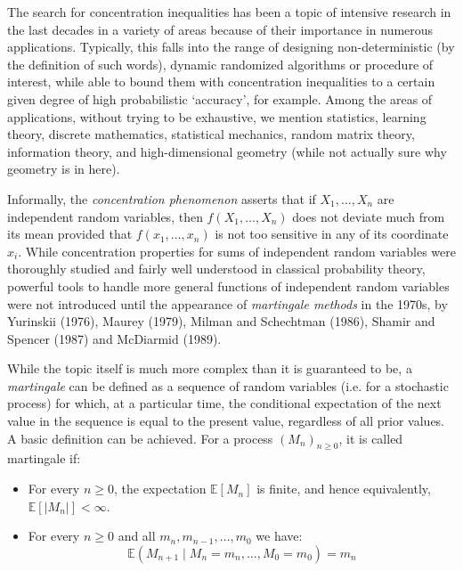 The search for concentration inequalities has been a topic of intensive research in the last decades in a variety of areas because of their importance in numerous applications. Typically, this falls into the range of designing non-deterministic (by the definition of such words), dynamic randomized algorithms or procedure of interest, while able to bound them with concentration inequalities to a certain given degree of high probabilistic `accuracy', for example. Among the areas of applications, without trying to be exhaustive, we mention statistics, learning theory, discrete mathematics, statistical mechanics, random matrix theory, information theory, and high-dimensional geometry (while not actually sure why geometry is in here). 

Informally, the \textit{concentration phenomenon} asserts that if $X_{1},\dots,X_{n}$ are independent random variables, then $f(X_{1},\dots,X_{n})$ does not deviate much from its mean provided that $f(x_{1},\dots,x_{n})$ is not too sensitive in any of its coordinate $x_{i}$. While concentration properties for sums of independent random variables were thoroughly studied and fairly well understood in classical probability theory, powerful tools to handle more general functions of independent random variables were not introduced until the appearance of \textit{martingale methods} in the 1970s, by Yurinskii (1976), Maurey (1979), Milman and Schechtman (1986), Shamir and Spencer (1987) and McDiarmid (1989).
\begin{note}
    While the topic itself is much more complex than it is guaranteed to be, a \textit{martingale} can be defined as a sequence of random variables (i.e. for a stochastic process) for which, at a particular time, the conditional expectation of the next value in the sequence is equal to the present value, regardless of all prior values. A basic definition can be achieved. For a process $(M_n)_{n\geq 0}$, it is called martingale if:
    \begin{itemize}[noitemsep,topsep=1pt]
        \item For every $n\geq 0$, the expectation $\mathbb{E}[M_n]$ is finite, and hence equivalently, $\mathbb{E}[\lvert M_n \rvert]< \infty$.
        \item For every $n\geq 0$ and all $m_{n},m_{n-1},\dots,m_{0}$ we have: \begin{equation}
            \mathbb{E}(M_{n+1}\mid M_n = m_{n},\dots, M_{0}=m_{0}) = m_{n}
        \end{equation}
    \end{itemize} 
\end{note}

